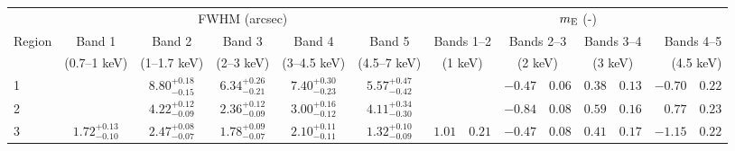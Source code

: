\begin{tabular}{@{}l ccccc r@{ $\pm$ }l r@{ $\pm$ }l r@{ $\pm$ }l r@{ $\pm$ }l @{}}

\toprule
{} & \multicolumn{5}{c}{FWHM (arcsec)} & \multicolumn{8}{c}{$m_\mathrm{E}$ (-)} \\
\cmidrule(lr){2-6} \cmidrule(l){7-14}
Region & Band 1 & Band 2 & Band 3 & Band 4 & Band 5
       & \multicolumn{2}{c}{Bands 1--2} & \multicolumn{2}{c}{Bands 2--3}
       & \multicolumn{2}{c}{Bands 3--4} & \multicolumn{2}{r}{Bands 4--5} \\ [0.2em]
{} & (0.7--1 keV) & (1--1.7 keV) & (2--3 keV) & (3--4.5 keV) & (4.5--7 keV)
   & \multicolumn{2}{c}{(1 keV)} & \multicolumn{2}{c}{(2 keV)}
   & \multicolumn{2}{c}{(3 keV)} & \multicolumn{2}{r}{(4.5 keV)} \\
\midrule
1 & {} & ${8.80}^{+0.18}_{-0.15}$ & ${6.34}^{+0.26}_{-0.21}$ & ${7.40}^{+0.30}_{-0.23}$ & ${5.57}^{+0.47}_{-0.42}$
  & \multicolumn{2}{c}{} & $-0.47$ & $0.06$ & $0.38$ & $0.13$ & $-0.70$ & $0.22$ \\ [0.5em]
2 & {} & ${4.22}^{+0.12}_{-0.09}$ & ${2.36}^{+0.12}_{-0.09}$ & ${3.00}^{+0.16}_{-0.12}$ & ${4.11}^{+0.34}_{-0.30}$
  & \multicolumn{2}{c}{} & $-0.84$ & $0.08$ & $0.59$ & $0.16$ & $0.77$ & $0.23$ \\ [0.5em]
3 & ${1.72}^{+0.13}_{-0.10}$ & ${2.47}^{+0.08}_{-0.07}$ & ${1.78}^{+0.09}_{-0.07}$ & ${2.10}^{+0.11}_{-0.11}$ & ${1.32}^{+0.10}_{-0.09}$
  & $1.01$ & $0.21$ & $-0.47$ & $0.08$ & $0.41$ & $0.17$ & $-1.15$ & $0.22$ \\


\end{tabular}
